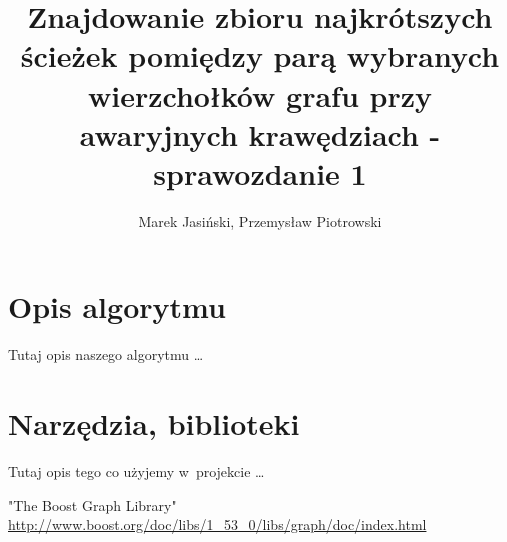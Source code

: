 \documentclass[a4paper, 12pt]{article}
\title {Znajdowanie zbioru najkrótszych ścieżek pomiędzy parą wybranych wierzchołków grafu przy awaryjnych krawędziach - sprawozdanie 1}
\author{Marek Jasiński, Przemysław Piotrowski}
\begin{document}
\maketitle

\section{Opis algorytmu}

Tutaj opis naszego algorytmu \dots

\section{Narzędzia, biblioteki}

Tutaj opis tego co użyjemy w~projekcie \dots \cite{bgl}

\begin{thebibliography}{}
 "The Boost Graph Library" \\ \url{http://www.boost.org/doc/libs/1_53_0/libs/graph/doc/index.html}
\end{thebibliography}
\end{document}
